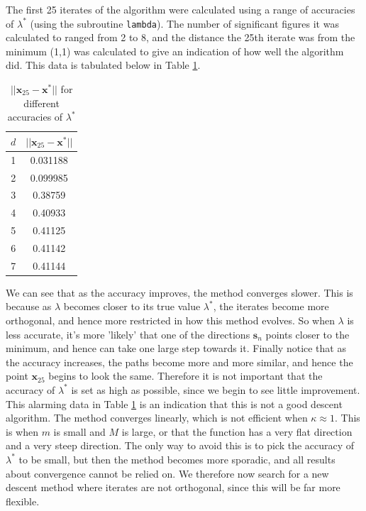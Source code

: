 \documentclass[10pt,a4paper,notitlepage]{article}
\newcommand{\abs}[1]{\lvert#1\rvert}
\newcommand{\x}{\mathbf{x}}
\newcommand{\s}{\mathbf{s}}
\begin{document}
The first 25 iterates of the algorithm were calculated using a range of accuracies of $\lambda^{*}$ (using the subroutine \texttt{lambda}). The number of significant figures it was calculated to ranged from 2 to 8, and the distance the 25th iterate was from the minimum (1,1) was calculated to give an indication of how well the algorithm did. This data is tabulated below in Table \ref{tb:2}.
\begin{table}[H]
\centering
\begin{tabular}{c|c}
$d$ & $\abs{\abs{\x_{25}-\x^{*}}}$\\
\hline 1 & 0.031188\\
2 & 0.099985\\
3 & 0.38759\\
4 & 0.40933\\
5 & 0.41125\\
6 & 0.41142\\
7 & 0.41144\\

\end{tabular}
\caption{$\abs{\abs{\x_{25}-\x^{*}}}$ for different accuracies of $\lambda^{*}$}\label{tb:2}
\end{table}
We can see that as the accuracy improves, the method converges slower. This is because as $\lambda$ becomes closer to its true value $\lambda^{*}$, the iterates become more orthogonal, and hence more restricted in how this method evolves. So when $\lambda$ is less accurate, it's more 'likely' that one of the directions $\s_{n}$ points closer to the minimum, and hence can take one large step towards it. Finally notice that as the accuracy increases, the paths become more and more similar, and hence the point $\x_{25}$ begins to look the same. Therefore it is not important that the accuracy of $\lambda^{*}$ is set as high as possible, since we begin to see little improvement.\\

This alarming data in Table \ref{tb:2} is an indication that this is not a good descent algorithm. The method converges linearly, which is not efficient when $\kappa\approx 1$. This is when $m$ is small and $M$ is large, or that the function has a very flat direction and a very steep direction. The only way to avoid this is to pick the accuracy of $\lambda^{*}$ to be small, but then the method becomes more sporadic, and all results about convergence cannot be relied on. We therefore now search for a new descent method where iterates are not orthogonal, since this will be far more flexible.
\end{document}
